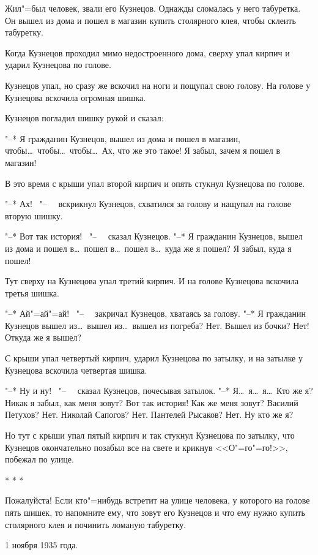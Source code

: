     Жил"=был  человек,  звали  его  Кузнецов. Однажды сломалась у него табуретка. Он вышел из дома и пошел в магазин купить  столярного клея, чтобы склеить табуретку.

    Когда Кузнецов проходил мимо недостроенного дома, сверху упал кирпич и ударил  Кузнецова по голове.

    Кузнецов  упал,  но  сразу же вскочил на ноги и пощупал свою голову. На голове у Кузнецова вскочила огромная шишка.

    Кузнецов погладил шишку рукой и сказал:
    
    "--* Я  гражданин Кузнецов, вышел из дома и пошел  в магазин, чтобы\dots\ чтобы\dots\ чтобы\dots\ Ах, что же это такое! Я забыл, зачем я пошел в магазин!

    В это время с крыши упал второй кирпич и опять стукнул Кузнецова по голове.

    "--* Ах! \ "--~ \ вскрикнул Кузнецов, схватился за голову и нащупал на голове вторую шишку.

    "--* Вот так история!  \ "--~ \  сказал  Кузнецов. "--* Я гражданин Кузнецов, вышел из дома и  пошел в\dots\ пошел  в\dots\ пошел в\dots\ куда же  я пошел? Я забыл, куда я пошел!

    Тут сверху на Кузнецова упал третий кирпич.  И на голове  Кузнецова вскочила третья шишка.

    "--* Ай"=ай"=ай! \ "--~ \  закричал Кузнецов, хватаясь за голову. "--*  Я гражданин Кузнецов вышел из\dots\ вышел из\dots\ вышел из погреба? Нет. Вышел из бочки? Нет! Откуда же я вышел?

    С  крыши  упал четвертый кирпич,  ударил Кузнецова  по затылку, и на затылке у Кузнецова вскочила четвертая шишка.

    "--* Ну и ну! \ "--~ \  сказал Кузнецов, почесывая затылок. "--* Я\dots\ я\dots\ я\dots\ Кто же я?  Никак я забыл, как меня зовут?  Вот так история! Как же меня зовут? Василий Петухов? Нет. Николай Сапогов? Нет. Пантелей Рысаков?  Нет. Ну кто же я?

    Но тут с  крыши  упал пятый кирпич и так стукнул Кузнецова по  затылку,  что Кузнецов окончательно позабыл  все на свете и крикнув <<О"=го"=го!>>, побежал по улице.

\begin {center}
*  *  *
\end{center}
                  
    Пожалуйста!  Если кто"=нибудь встретит на улице  человека, у  которого  на голове пять шишек, то  напомните ему, что зовут его Кузнецов и что ему нужно купить столярного клея и починить ломаную табуретку.

\begin{flushright}
1 ноября 1935 года.
\end{flushright}